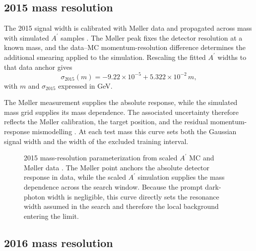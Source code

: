 \subsection{2015 mass resolution}
\label{sec:massres-2015}

The 2015 signal width is calibrated with M{\o}ller data and propagated across mass
with simulated $A^\prime$ samples \cite{HPS2015InternalNote}. The M{\o}ller peak fixes
the detector resolution at a known mass, and the data--MC momentum-resolution
difference determines the additional smearing applied to the simulation. Rescaling
the fitted $A^\prime$ widths to that data anchor gives
\begin{equation}
\sigma_{2015}(m) = -9.22\times10^{-5} + 5.322\times10^{-2}\,m,
\label{eq:sigma2015}
\end{equation}
with $m$ and $\sigma_{2015}$ expressed in GeV.

The M{\o}ller measurement supplies the absolute response, while the simulated mass
grid supplies its mass dependence. The associated uncertainty therefore reflects the
M{\o}ller calibration, the target position, and the residual momentum-response
mismodelling \cite{HPS2015DarkPhoton,HPS2015InternalNote}. At each test mass this curve
sets both the Gaussian signal width and the width of the excluded training interval.

\begin{figure}[H]
\centering
{}
\caption{2015 mass-resolution parameterization from scaled $A^\prime$ MC and M{\o}ller
data \cite{HPS2015InternalNote}. The M{\o}ller point anchors the absolute detector
response in data, while the scaled $A^\prime$ simulation supplies the mass dependence
across the search window. Because the prompt dark-photon width is negligible, this
curve directly sets the resonance width assumed in the search and therefore the local
background entering the limit.}
\label{fig:2015-resolution}
\end{figure}

\subsection{2016 mass resolution}
\label{sec:massres-2016}

